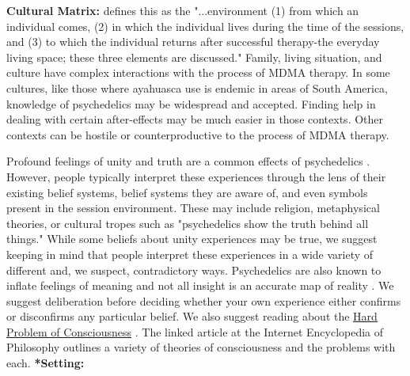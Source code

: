 \documentclass[12pt,letterpaper]{article}
\begin{document}
\noindent \textbf{Cultural Matrix:} \textcite{setSettingMatrix} defines this as the "...environment (1) from which an individual comes, (2) in which the individual lives during the time of the sessions, and (3) to which the individual returns after successful therapy-the everyday living space; these three elements are discussed." Family, living situation, and culture have complex interactions with the process of MDMA therapy. In some cultures, like those where ayahuasca use is endemic in areas of South America, knowledge of psychedelics may be widespread and accepted. Finding help in dealing with certain after-effects may be much easier in those contexts. Other contexts can be hostile or counterproductive to the process of MDMA therapy. 

Profound feelings of unity and truth are a common effects of psychedelics \cite{yaden2022varieties}. However, people typically interpret these experiences through the lens of their existing belief systems, belief systems they are aware of, and even symbols present in the session environment. These may include religion, metaphysical theories, or cultural tropes such as "psychedelics show the truth behind all things." While some beliefs about unity experiences may be true, we suggest keeping in mind that people interpret these experiences in a wide variety of different and, we suspect, contradictory ways. Psychedelics are also known to inflate feelings of meaning and not all insight is an accurate map of reality \cite{hartogsohn2018meaning,tulverInsight}. We suggest deliberation before deciding whether your own experience either confirms or disconfirms any particular belief. We also suggest reading about the \href{https://iep.utm.edu/hard-problem-of-conciousness}{Hard Problem of Consciousness} \cite{hardProblem}. The linked article at the Internet Encyclopedia of Philosophy outlines a variety of theories of consciousness and the problems with each.
\noindent \textbf{*Setting:}
\end{document}
